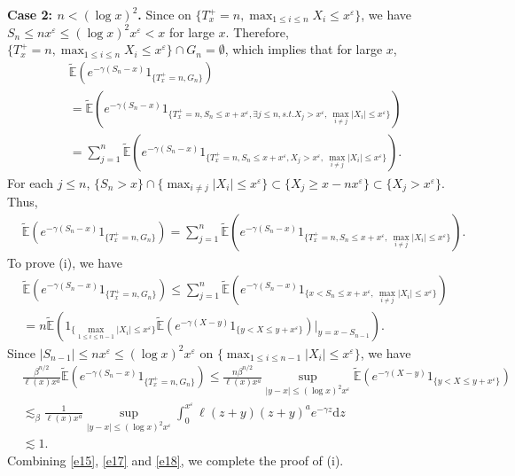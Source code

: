 \documentclass[10pt,a4paper]{amsart}
\numberwithin{equation}{section}
\begin{document}
\noindent
{\bf Case 2: $n  <(\log x)^2$.}  Since on $\{T_x^+=n, \max_{1\leq i\leq n} X_i \leq x^{\varepsilon}\}$, we have  $S_n \leq n x^{\varepsilon}\leq (\log x)^2 x^{\varepsilon} <x$ for large $x$. Therefore, $\{T_x^+=n, \max_{1\leq i\leq n} X_i \leq x^{\varepsilon}\}\cap G_n=\emptyset$, which implies that for large $x$, 
\begin{align}\label{e13}
		  & \widetilde{\mathbb{E}}\left(e^{-\gamma (S_n-x)}1_{\{T_x^+=n, G_n\}}\right)  \nonumber\\
		  &= 	 \widetilde{\mathbb{E}}\left(e^{-\gamma (S_n-x)}1_{\{T_x^+=n, S_n\leq x+x^\varepsilon,  \exists   j\leq n, s.t. X_j>x^\varepsilon,\ \max_{i\neq j} |X_i| \leq x^{\varepsilon}  \}}\right) \nonumber\\
		  & = \sum_{j=1}^n  \widetilde{\mathbb{E}}\left(e^{-\gamma (S_n-x)}1_{\{T_x^+=n, S_n\leq x+x^\varepsilon,   X_j>x^\varepsilon,\ \max_{i\neq j} |X_i| \leq x^{\varepsilon}  \}}\right) .
\end{align}
For each $j\leq n$, $\{S_n>x\}\cap \{\max_{i\neq j} |X_i| \leq x^{\varepsilon}   \}\subset \{X_j \geq x- nx^\varepsilon\}\subset \{X_j >x^\varepsilon\}$. Thus,
\begin{align}\label{e16}
	  & \widetilde{\mathbb{E}}\left(e^{-\gamma (S_n-x)}1_{\{T_x^+=n, G_n\}}\right)   = \sum_{j=1}^n  \widetilde{\mathbb{E}}\left(e^{-\gamma (S_n-x)}1_{\{T_x^+=n, S_n\leq x+x^\varepsilon, \ \max_{i\neq j} |X_i| \leq x^{\varepsilon}  \}}\right) .
\end{align}
To prove (i),   we have 
\begin{align}
	  & \widetilde{\mathbb{E}}\left(e^{-\gamma (S_n-x)}1_{\{T_x^+=n, G_n\}}\right)   \leq \sum_{j=1}^n  \widetilde{\mathbb{E}}\left(e^{-\gamma (S_n-x)}1_{\{ x<S_n\leq x+x^\varepsilon, \ \max_{i\neq j} |X_i| \leq x^{\varepsilon}  \}}\right) \nonumber\\
	  & = n \widetilde{\mathbb{E}}\left(1_{\{ \max_{1\leq i\leq n-1} |X_i| \leq x^{\varepsilon}  \}} \widetilde{\mathbb{E}} \left(e^{-\gamma (X-y)}1_{\{ y< X\leq y+x^\varepsilon\}}\right)\Big|_{y=x-S_{n-1}}\right). 
\end{align}
Since $|S_{n-1}|\leq nx^\varepsilon \leq (\log x)^2 x^{\varepsilon} $ on $\{ \max_{1\leq i\leq n-1} |X_i| \leq x^{\varepsilon}  \}$, we have
\begin{align}\label{e18}
	& \frac{ \beta^{n/2}}{\ell(x) x^a} \widetilde{\mathbb{E}}\left(e^{-\gamma (S_n-x)}1_{\{T_x^+=n, G_n\}}\right) \leq 	 \frac{ n\beta^{n/2} }{\ell(x) x^a} \sup_{|y-x|\leq (\log x)^2 x^{\varepsilon}} \widetilde{\mathbb{E}} \left(e^{-\gamma (X-y)}1_{\{ y< X\leq y+x^\varepsilon\}}\right)\nonumber\\
	& \lesssim_\beta  \frac{  1}{\ell(x) x^a}\sup_{|y-x|\leq (\log x)^2 x^{\varepsilon}}  \int_0^{x^\varepsilon} \ell(z+y) (z+y)^a e^{-\gamma z}\mathrm{d}z \nonumber\\
	& \lesssim 1. 
\end{align}
Combining \eqref{e15}, \eqref{e17} and \eqref{e18}, we complete the proof of (i).
\end{document}
